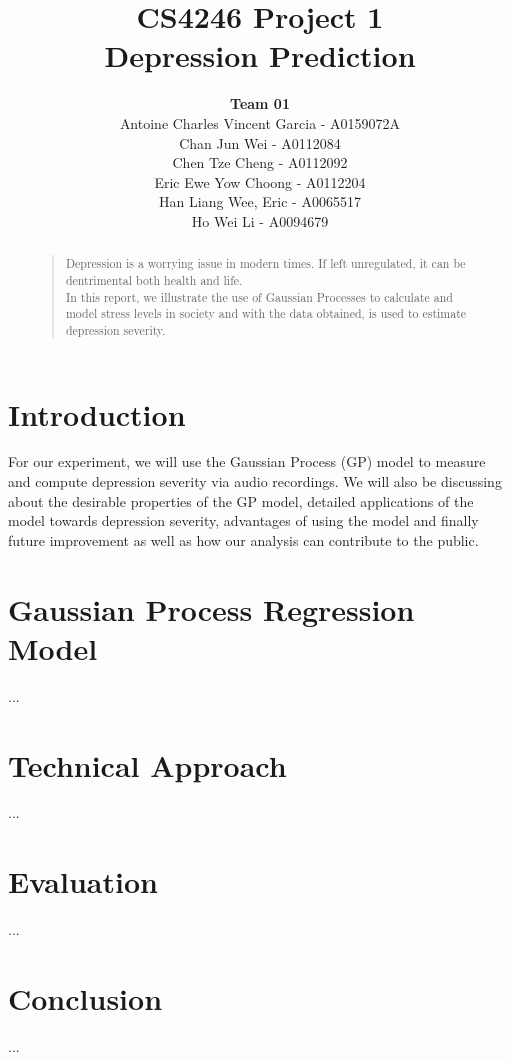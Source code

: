 \documentclass{article}
\title{
	CS4246 Project 1\\ Depression Prediction
}
\author{
	{\bf Team 01} \\
	Antoine Charles Vincent Garcia - A0159072A\\
	Chan Jun Wei - A0112084\\
	Chen Tze Cheng - A0112092\\
	Eric Ewe Yow Choong - A0112204\\
	Han Liang Wee, Eric - A0065517\\
	Ho Wei Li - A0094679\\
}
\begin{document}
 	\maketitle

	\begin{abstract}
	\begin{quote}
	Depression is a worrying issue in modern times. If left unregulated, it can be dentrimental both health and life. \\
	
	In this report, we illustrate the use of Gaussian Processes to calculate and model stress levels in society and with the data obtained, is used to estimate depression severity.
	\end{quote}
	\end{abstract}
	
	\section{Introduction}
	For our experiment, we will use the Gaussian Process (GP) model to measure and compute depression severity via audio recordings. We will also be discussing about the desirable properties of the GP model, detailed applications of the model towards depression severity, advantages of using the model and finally future improvement as well as how our analysis can contribute to the public. \\

	\section{Gaussian Process Regression Model}
	... \\

	\section{Technical Approach}
	... \\	

	\section{Evaluation}
	... \\

	\section{Conclusion}	
	... \\
\end{document}
